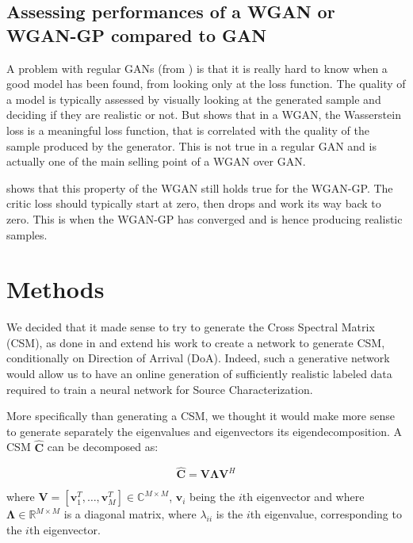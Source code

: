 \documentclass{article}
\begin{document}
\subsection{Assessing performances of a WGAN or WGAN-GP compared to GAN}

A problem with regular GANs (from \cite{goodfellow2020generative}) is that it is really hard to know when a good model has been found, from looking only at the loss function. The quality of a model is typically assessed by visually looking at the generated sample and deciding if they are realistic or not. But \cite{arjovsky2017wasserstein} shows that in a WGAN, the Wasserstein loss is a meaningful loss function, that is correlated with the quality of the sample produced by the generator. This is not true in a regular GAN and is actually one of the main selling point of a WGAN over GAN.

\cite{DBLP:journals/corr/GulrajaniAADC17} shows that this property of the WGAN still holds true for the WGAN-GP. The critic loss should typically start at zero, then drops and work its way back to zero. This is when the WGAN-GP has converged and is hence producing realistic samples.

\section{Methods}

We decided that it made sense to try to generate the Cross Spectral Matrix (CSM), as done in \cite{gerstoft2020parametric} and extend his work to create a network to generate CSM, conditionally on Direction of Arrival (DoA). Indeed, such a generative network would allow us to have an online generation of sufficiently realistic labeled data required to train a neural network for Source Characterization.

More specifically than generating a CSM, we thought it would make more sense to generate separately the eigenvalues and eigenvectors its eigendecomposition. A CSM $\mathbf{\hat{C}}$ can be decomposed as:

\begin{equation}
    \mathbf{\hat{C}} = \mathbf{V} \mathbf{\Lambda} \mathbf{V}^H
\end{equation}

where $\mathbf{V} = [\mathbf{v}_1^T, \dots, \mathbf{v}_M^T] \in \mathbb{C}^{M \times M}$, $\mathbf{v}_i$ being the $i$th eigenvector and where $\mathbf{\Lambda} \in \mathbb{R}^{M \times M}$ is a diagonal matrix, where $\lambda_{ii}$ is the $i$th eigenvalue, corresponding to the $i$th eigenvector.
\end{document}
